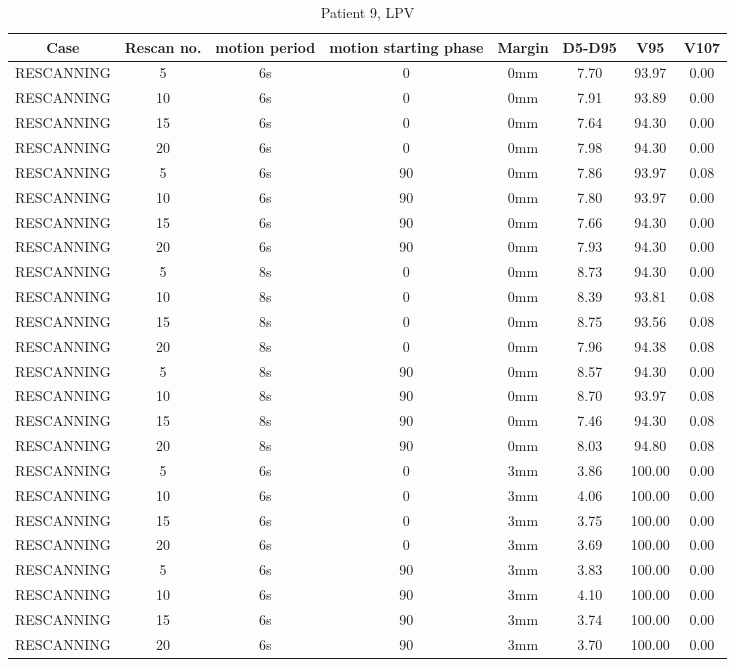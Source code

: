 \begin{table}[H]
  \centering
   \scriptsize 
  \caption{Patient 9, LPV}
  \begin{tabular}{|c|c||c|c|c||c|c|c|}
    \hline\hline
    Case & Rescan no. & motion period & motion starting phase & Margin & D5-D95 & V95 & V107\\
    \hline 
RESCANNING & 5 & 6s & 0 & 0mm & 7.70 & 93.97 & 0.00 \\
RESCANNING & 10 & 6s & 0 & 0mm & 7.91 & 93.89 & 0.00 \\
RESCANNING & 15 & 6s & 0 & 0mm & 7.64 & 94.30 & 0.00 \\
RESCANNING & 20 & 6s & 0 & 0mm & 7.98 & 94.30 & 0.00 \\
RESCANNING & 5 & 6s & 90 & 0mm & 7.86 & 93.97 & 0.08 \\
RESCANNING & 10 & 6s & 90 & 0mm & 7.80 & 93.97 & 0.00 \\
RESCANNING & 15 & 6s & 90 & 0mm & 7.66 & 94.30 & 0.00 \\
RESCANNING & 20 & 6s & 90 & 0mm & 7.93 & 94.30 & 0.00 \\
RESCANNING & 5 & 8s & 0 & 0mm & 8.73 & 94.30 & 0.00 \\
RESCANNING & 10 & 8s & 0 & 0mm & 8.39 & 93.81 & 0.08 \\
RESCANNING & 15 & 8s & 0 & 0mm & 8.75 & 93.56 & 0.08 \\
RESCANNING & 20 & 8s & 0 & 0mm & 7.96 & 94.38 & 0.08 \\
RESCANNING & 5 & 8s & 90 & 0mm & 8.57 & 94.30 & 0.00 \\
RESCANNING & 10 & 8s & 90 & 0mm & 8.70 & 93.97 & 0.08 \\
RESCANNING & 15 & 8s & 90 & 0mm & 7.46 & 94.30 & 0.08 \\
RESCANNING & 20 & 8s & 90 & 0mm & 8.03 & 94.80 & 0.08 \\
RESCANNING & 5 & 6s & 0 & 3mm & 3.86 & 100.00 & 0.00 \\
RESCANNING & 10 & 6s & 0 & 3mm & 4.06 & 100.00 & 0.00 \\
RESCANNING & 15 & 6s & 0 & 3mm & 3.75 & 100.00 & 0.00 \\
RESCANNING & 20 & 6s & 0 & 3mm & 3.69 & 100.00 & 0.00 \\
RESCANNING & 5 & 6s & 90 & 3mm & 3.83 & 100.00 & 0.00 \\
RESCANNING & 10 & 6s & 90 & 3mm & 4.10 & 100.00 & 0.00 \\
RESCANNING & 15 & 6s & 90 & 3mm & 3.74 & 100.00 & 0.00 \\
RESCANNING & 20 & 6s & 90 & 3mm & 3.70 & 100.00 & 0.00 \\

\end{tabular}
\end{table}
